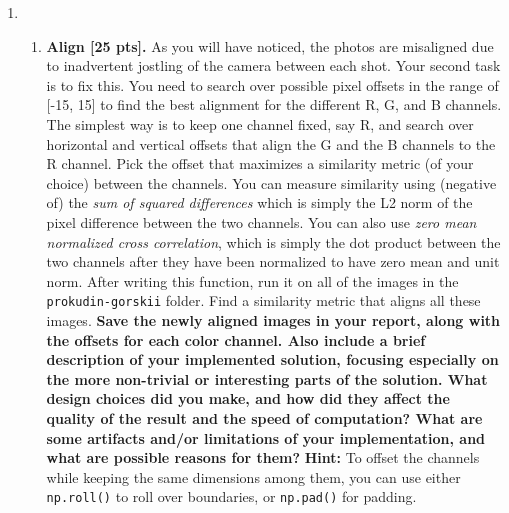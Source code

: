 \documentclass{article}
\def\pts#1{\textbf{[#1 pts]}}
\newenvironment{Q}{\clearpage \item}{\phantom{s} \bigskip}
\begin{document}
\begin{enumerate}
\begin{Q}
\begin{enumerate}
    \item \textbf{Align \pts{25}.} As you will have noticed, the photos are misaligned due to inadvertent jostling of the camera between each shot. Your second task is to fix this. You need to search over possible pixel offsets in the range of [-15, 15] to find the best alignment for the different R, G, and B channels. The simplest way is to keep one channel fixed, say R, and search over horizontal and vertical offsets that align the G and the B channels to the R channel. Pick the offset that maximizes a similarity metric (of your choice) between the channels. 
    You can measure similarity using (negative of) the \textit{sum of squared differences} which is simply the L2 norm of the pixel difference between the two channels. You can also use \textit{zero mean normalized cross correlation}, which is simply the dot product between the two channels after they have been normalized to have zero mean and unit norm. 
    After writing this function, run it on all of the images in the \texttt{prokudin-gorskii} folder. Find a similarity metric that aligns all these images.
    \textbf{Save the newly aligned images in your report, along with the offsets for each color channel. 
    Also include a brief description of your implemented solution, focusing especially on the more non-trivial or interesting parts of the solution. What design choices did you make, and how did they affect the quality of the result and the speed of computation? What are some artifacts and/or limitations of your implementation, and what are possible reasons for them?}
    \textbf{Hint:} To offset the channels while keeping the same dimensions among them, you can use either \texttt{np.roll()} to roll over boundaries, or \texttt{np.pad()} for padding.
    

\end{enumerate}
\end{Q}
\end{enumerate}
\end{document}
